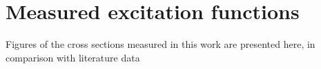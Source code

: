 % 
% 
\section{Measured excitation functions} \label{sec:fe_xs_figures}

Figures of the cross sections measured in this work are presented here, in comparison with literature data







